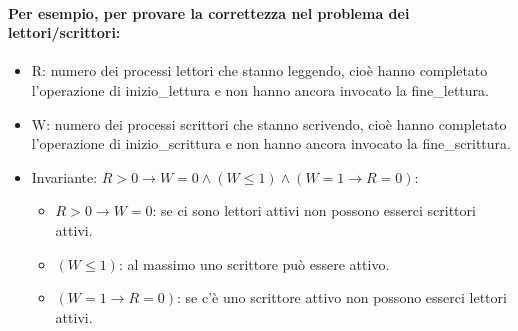 \paragraph{Per esempio, per provare la correttezza nel problema dei lettori/scrittori:}

\begin{itemize}
	\item R: numero dei processi lettori che stanno leggendo, cioè
	      hanno completato l’operazione di inizio\_lettura e
	      non hanno ancora invocato la fine\_lettura.
	\item W: numero dei processi scrittori che stanno scrivendo, cioè
	      hanno completato l’operazione di inizio\_scrittura e
	      non hanno ancora invocato la fine\_scrittura.
	\item Invariante: $R > 0 \rightarrow W = 0 \land (W \leq 1) \land (W = 1 \rightarrow R = 0)$:
	      \begin{itemize}
		      \item $R > 0 \rightarrow W = 0$: se ci sono lettori attivi non possono esserci scrittori attivi.
		      \item $(W \leq 1)$: al massimo uno scrittore può essere attivo.
		      \item $(W = 1 \rightarrow R = 0)$: se c'è uno scrittore attivo non possono esserci lettori attivi.
	      \end{itemize}
\end{itemize}



